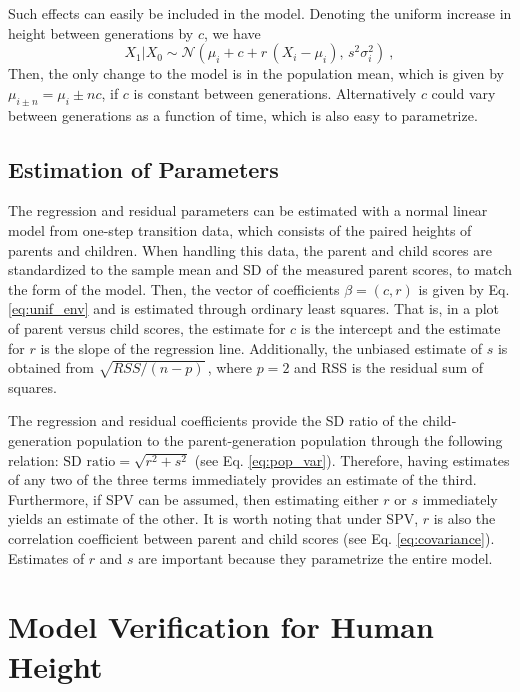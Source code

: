 \documentclass{svproc} %
\begin{document}
Such effects can easily be included in the model. Denoting the uniform increase in height between generations by $c$, we have 
\begin{equation}
X_1|X_0 \sim \mathcal{N}(\mu_i + c + r \, (X_i - \mu_i), \, s^2 \sigma_i^2) \ ,
\label{eq:unif_env}
\end{equation}
Then, the only change to the model is in the population mean, which is given by $\mu_{i \pm n} = \mu_i \pm n c$, if $c$ is constant between generations. Alternatively $c$ could vary between generations as a function of time, which is also easy to parametrize.


\subsection{Estimation of Parameters} \label{estimation}

The regression and residual parameters can be estimated with a normal linear model from one-step transition data, which consists of the paired heights of parents and children. When handling this data, the parent and child scores are standardized to the sample mean and SD of the measured parent scores, to match the form of the model. Then, the vector of coefficients $\beta = (c, r)$ is given by Eq. \ref{eq:unif_env} and is estimated through ordinary least squares. That is, in a plot of parent versus child scores, the estimate for $c$ is the intercept and the estimate for $r$ is the slope of the regression line. Additionally, the unbiased estimate of $s$ is obtained from $\sqrt{RSS / (n-p)} \,$, where $p = 2$ and RSS is the residual sum of squares. 


The regression and residual coefficients provide the SD ratio of the child-generation population to the parent-generation population through the following relation: $\mathrm{SD}\,\, \mathrm{ratio} =  \sqrt{r^2+s^2}$ (see Eq. \ref{eq:pop_var}). Therefore, having estimates of any two of the three terms immediately provides an estimate of the third. Furthermore, if SPV can be assumed, then estimating either $r$ or $s$ immediately yields an estimate of the other. It is worth noting that under SPV, $r$ is also the correlation coefficient between parent and child scores (see Eq. \ref{eq:covariance}). Estimates of $r$ and $s$ are important because they parametrize the entire model.



\section{Model Verification for Human Height}
\end{document}
